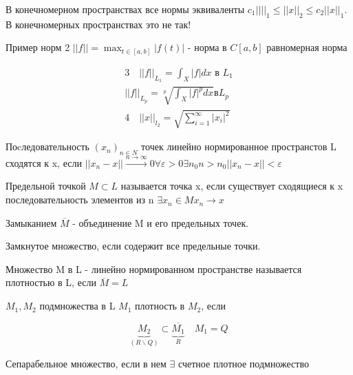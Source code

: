 \documentclass[12pt, a4paper]{report}
\begin{document}
В конечномерном пространствах все нормы эквиваленты \( c_1||||_1 \le  ||x||_2 \le  c_2 ||x||_1 \). В конечномерных пространствах это не так! 

Пример норм 2 \( ||f||  = \max_{t \in [ a,b] }|f(t)|  \) - норма в \( C [ a,b] \) равномерная норма

\begin{gather*}
    3 \quad  ||f||_{L_1} = \int_{X} |f|dx \text{ в  }  L_1 \\
    ||f||_{L_p} = \sqrt[p]{\int_{X}|f|^p dx} \text{в}  L_{p} \\
    4  \quad ||x||_{l_2}= \sqrt{\sum^{\infty }_{i=1} |x_i| ^2   }   
\end{gather*}

\begin{definition}
     Поcледовательность \( (x_n)_{n \in  N}  \) точек линейно нормированное пространстов L сходятся к x, если  \( ||x_n - x|| \xrightarrow{n \to  \infty } 0 \forall \varepsilon > 0 \exists n_0 n > n_0 ||x_n - x|| < \varepsilon   \) 
\end{definition}

\begin{definition}
    Предельной точкой \( M \subset L  \)  называется точка x, если существует сходящиеся к x последовательность элементов из n \( \exists x_n \in  M x_n \to x  \) 
\end{definition}

\begin{definition}
    Замыканием \( \overline{M}  \) - объединение  M и его предельных точек. 
\end{definition}

\begin{definition}
    Замкнутое множество, если содержит все предельные точки.
\end{definition}

\begin{definition}
    Множество M в L - линейно нормированном пространстве называется плотностью в L, если \( \overline{M}= L  \) 
\end{definition}

\begin{definition}
    \( M_1,M_2  \) подмножества в L \( M_1  \)  плотность в \(  M_2 \), если 
    
    \[ \underbrace{M_2}_{(R \backslash Q )} \subset \underbrace{\overline{M_1} }_{R } \quad M_1=Q   \]
\end{definition}

\begin{definition}
    Сепарабельное множество, если в нем \( \exists  \) счетное плотное подмножество
\end{definition}




\ifdefined\mainfile
\else
    
\end{document}

